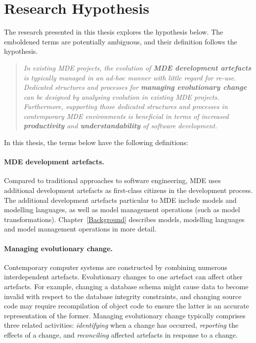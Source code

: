 
\section{Research Hypothesis}
\label{sec:hypothesis}

The research presented in this thesis explores the hypothesis below. The emboldened terms are potentially ambiguous, and their definition follows the hypothesis.

\begin{quote}
\emph{In existing MDE projects, the evolution of \textbf{MDE development artefacts} is typically managed in an ad-hoc manner with little regard for re-use. Dedicated structures and processes for \textbf{managing evolutionary change} can be designed by analysing evolution in existing MDE projects. Furthermore, supporting those dedicated structures and processes in contemporary MDE environments is beneficial in terms of increased \textbf{productivity} and \textbf{understandability} of software development.}
\end{quote}

In this thesis, the terms below have the following definitions:

\paragraph{MDE development artefacts.} Compared to traditional approaches to software engineering, MDE uses additional development artefacts as first-class citizens in the development process. The additional development artefacts particular to MDE include models and modelling languages, as well as model management operations (such as model transformations). Chapter~\ref{Background} describes models, modelling languages and model management operations in more detail.

\paragraph{Managing evolutionary change.} Contemporary computer systems are constructed by combining numerous interdependent artefacts. Evolutionary changes to one artefact can affect other artefacts. For example, changing a database schema might cause data to become invalid with respect to the database integrity constraints, and changing source code may require recompilation of object code to ensure the latter is an accurate representation of the former. Managing evolutionary change typically comprises three related activities: \emph{identifying} when a change has occurred, \emph{reporting} the effects of a change, and \emph{reconciling} affected artefacts in response to a change.

